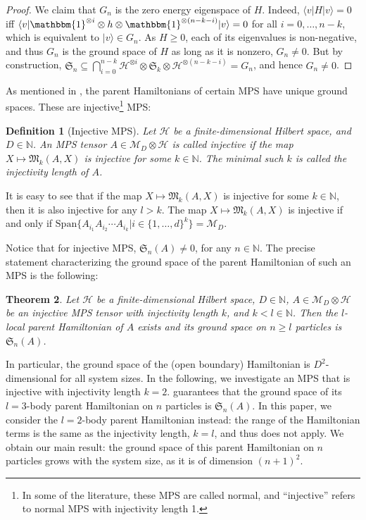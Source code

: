 \documentclass[a4paper]{article}
\newcommand{\ket}[1]{\vert #1 \rangle}
\newcommand{\bra}[1]{\langle #1 \vert}
\newcommand{\id}{\mathbbm{1}}
\newcommand{\Span}{\mathrm{Span}}
\newtheorem{theorem}{Theorem}
\newtheorem{definition}[theorem]{Definition}
\theoremstyle{definition}
\begin{document}
\begin{proof}
    We claim that $G_n$ is the zero energy eigenspace of $H$. Indeed, $\bra{v}H\ket{v} = 0$ iff $\bra{v}\id^{\otimes i} \otimes h \otimes \id^{\otimes (n-k-i)} \ket{v}=0$ for all $i=0,\dots, n-k$, which is equivalent to $\ket{v}\in G_n$. As $H\geq 0$, each of its eigenvalues is non-negative, and thus $G_n$ is the ground space of $H$ as long as it is nonzero, $G_n\neq 0$. But by construction, $\mathfrak{S}_n \subseteq \bigcap_{i=0}^{n-k} \mathcal{H}^{\otimes i} \otimes \mathfrak{S}_k \otimes \mathcal{H}^{\otimes (n-k-i)} = G_n$, and hence $G_n \neq 0$. 
\end{proof}

As mentioned in , the parent Hamiltonians of certain MPS have unique ground spaces. These are injective\footnote{In some of the literature, these MPS are called normal, and ``injective'' refers to normal MPS with injectivity length 1.} MPS:
\begin{definition}[Injective MPS]
    Let $\mathcal{H}$ be a finite-dimensional Hilbert space, and $D\in \mathbb{N}$. An MPS tensor $A\in \mathcal{M}_D \otimes \mathcal{H}$ is called injective if the map $X\mapsto \mathfrak{M}_k(A,X)$ is injective for some $k\in\mathbb{N}$. The minimal such $k$ is called the injectivity length of $A$.
\end{definition}

It is easy to see that if the map $X\mapsto \mathfrak{M}_k(A,X)$ is injective for some $k\in\mathbb{N}$, then it is also injective for any $l>k$. The map $X\mapsto \mathfrak{M}_k(A,X)$ is injective if and only if $\Span\{A_{i_1} A_{i_2} \cdots A_{i_k}| i\in \{1,\dots, d\}^k\} = \mathcal{M}_D$.  


Notice that for injective MPS, $\mathfrak{S}_n(A) \neq 0$, for any $n\in\mathbb{N}$. The precise statement characterizing the ground space of the parent Hamiltonian of such an MPS is the following:
\begin{theorem}\label{thm:parent_hamiltonian_uniqe_gs}
    Let $\mathcal{H}$ be a finite-dimensional Hilbert space, $D\in \mathbb{N}$, $A\in\mathcal{M}_D \otimes \mathcal{H}$ be an injective MPS tensor with injectivity length $k$, and $k<l\in \mathbb{N}$. Then the $l$-local parent Hamiltonian of $A$ exists and its ground space on $n\geq l$ particles is $\mathfrak{S}_n(A)$.
\end{theorem}

In particular, the ground space of the (open boundary) Hamiltonian is $D^2$-dimensional for all system sizes. In the following, we investigate an MPS that is injective with injectivity length $k=2$.  guarantees that the ground space of its $l=3$-body parent Hamiltonian on $n$ particles is $\mathfrak{S}_n(A)$. In this paper, we consider the $l=2$-body parent Hamiltonian instead: the range of the Hamiltonian terms is the same as the injectivity length, $k=l$, and thus  does not apply. We obtain our main result: the ground space of this parent Hamiltonian on $n$ particles grows with the system size, as it is of dimension $(n+1)^2$. 
\end{document}
